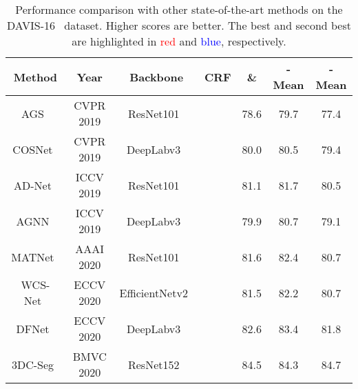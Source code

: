 \documentclass[10pt,twocolumn,letterpaper]{article}
\begin{document}
\begin{table*}[t]
	\begin{center}
		\caption{Performance comparison with other state-of-the-art methods on the DAVIS-16~\cite{perazzi2016benchmark} dataset. Higher scores are better. The best and second best are highlighted in \textcolor{red}{red} and \textcolor{blue}{blue}, respectively.
	}
		\label{table:tb1}
		\begin{tabular}{c|c|c|P{1.5cm}|ccc}
			\hline
			Method       & Year                  & Backbone       & CRF                   & \&                 & -Mean               & -Mean               \\ \hline
			AGS~\cite{wang2019learning}          & CVPR 2019             & ResNet101~\cite{he2016deep}      &                   & 78.6                 & 79.7                 & 77.4                 \\
			COSNet~\cite{lu2019see}       & CVPR 2019             & DeepLabv3~\cite{chen2017rethinking}  &                   & 80.0                 & 80.5                 & 79.4                 \\
			AD-Net~\cite{yang2019anchor}       & ICCV 2019             & ResNet101~\cite{he2016deep}      &                       & 81.1                 & 81.7                 & 80.5                 \\
			AGNN~\cite{wang2019zero}         & ICCV 2019             & DeepLabv3~\cite{chen2017rethinking}      &                   & 79.9                 & 80.7                 & 79.1                 \\
			MATNet~\cite{zhou2020motion}       & AAAI 2020             & ResNet101~\cite{he2016deep}      &                       & 81.6                 & 82.4                 & 80.7                 \\
			WCS-Net~\cite{zhang2020unsupervised}      & ECCV 2020             & EfficientNetv2~\cite{tan2021efficientnetv2} &                   & 81.5                 & 82.2                 & 80.7                 \\
			DFNet~\cite{zhen2020learning}        & ECCV 2020             & DeepLabv3~\cite{chen2017rethinking}      &                   & 82.6                 & 83.4                 & 81.8                 \\
			3DC-Seg~\cite{mahadevan2020making}      & BMVC 2020             & ResNet152~\cite{he2016deep}      &                       & 84.5                 & 84.3                 & 84.7                 \\

\end{tabular}
\end{center}
\end{table*}
\end{document}
